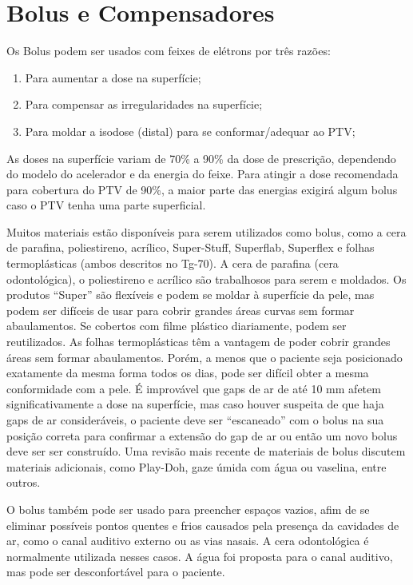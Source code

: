 \documentclass[11pt,a4paper]{article}
\begin{document}
\section{Bolus e Compensadores}

	Os Bolus podem ser usados com feixes de elétrons por três razões:

	\begin{enumerate}
		\item Para aumentar a dose na superfície;
		\item Para compensar as irregularidades na superfície;
		\item Para moldar a isodose (distal) para se conformar/adequar ao PTV;
	\end{enumerate}
	
	As doses na superfície variam de 70\% a 90\% da dose de prescrição, dependendo do modelo do acelerador e da energia do feixe. Para atingir a dose recomendada para cobertura do PTV de 90\%, a maior parte das energias exigirá algum bolus caso o PTV tenha uma parte superficial. 
	
	Muitos materiais estão disponíveis para serem utilizados como bolus, como a cera de parafina, poliestireno, acrílico, Super-Stuff, Superflab, Superflex e folhas termoplásticas (ambos descritos no Tg-70). A cera de parafina (cera odontológica), o poliestireno e acrílico são trabalhosos para serem  e moldados. Os produtos ``Super'' são flexíveis e podem se moldar à superfície da pele, mas podem ser difíceis de usar para cobrir grandes áreas curvas sem formar  abaulamentos. Se cobertos com filme plástico diariamente, podem ser reutilizados. As folhas termoplásticas têm a vantagem de poder cobrir grandes áreas sem formar abaulamentos. Porém, a menos que o paciente seja posicionado exatamente da mesma forma todos os dias, pode ser difícil obter a mesma conformidade com a pele. É improvável que gaps de ar de até 10 mm afetem significativamente a dose na superfície, mas caso houver suspeita de que haja gaps de ar consideráveis, o paciente deve ser ``escaneado'' com o bolus na sua posição correta para confirmar a extensão do gap de ar ou então um novo bolus deve ser ser construído. Uma revisão mais recente de materiais de bolus discutem materiais adicionais, como Play-Doh, gaze úmida com água ou vaselina, entre outros.

	O bolus também pode ser usado para preencher espaços vazios, afim de se eliminar possíveis pontos quentes e frios causados pela presença da cavidades de ar, como o canal auditivo externo ou as vias nasais. A cera odontológica é normalmente utilizada nesses casos. A água foi proposta para o canal auditivo, mas pode ser desconfortável para o paciente. 
\end{document}

